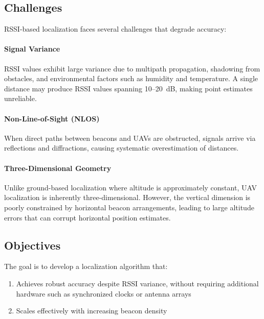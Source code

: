 \documentclass[master,final,11pt]{iscs-thesis}
\begin{document}
\subsection{Challenges}

RSSI-based localization faces several challenges that degrade accuracy:

\paragraph{Signal Variance}
RSSI values exhibit large variance due to multipath propagation, shadowing from obstacles, and environmental factors such as humidity and temperature.
A single distance may produce RSSI values spanning 10--20~dB, making point estimates unreliable.

\paragraph{Non-Line-of-Sight (NLOS)}
When direct paths between beacons and UAVs are obstructed, signals arrive via reflections and diffractions, causing systematic overestimation of distances.

\paragraph{Three-Dimensional Geometry}
Unlike ground-based localization where altitude is approximately constant, UAV localization is inherently three-dimensional.
However, the vertical dimension is poorly constrained by horizontal beacon arrangements, leading to large altitude errors that can corrupt horizontal position estimates.

\subsection{Objectives}

The goal is to develop a localization algorithm that:
\begin{enumerate}
    \item Achieves robust accuracy despite RSSI variance, without requiring additional hardware such as synchronized clocks or antenna arrays
    \item Scales effectively with increasing beacon density
\end{enumerate}

\end{document}

